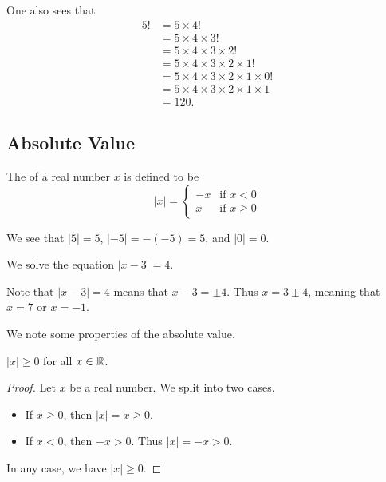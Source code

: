 \begin{example}
    One also sees that
    \begin{align*}
        5! &= 5 \times 4!\\
        &= 5 \times 4 \times 3!\\
        &= 5 \times 4 \times 3 \times 2!\\
        &= 5 \times 4 \times 3 \times 2 \times 1!\\
        &= 5 \times 4 \times 3 \times 2 \times 1 \times 0!\\
        &= 5 \times 4 \times 3 \times 2  \times 1  \times 1\\
        &= 120.
    \end{align*}
\end{example}

\subsection{Absolute Value}
\begin{definition}
    The  of a real number $x$ is defined to be
    \[
        |x| = \begin{cases}
            -x & \text{if } x < 0\\
            x & \text{if } x \geq 0
        \end{cases}
    \]
\end{definition}

\begin{example}
    We see that $|5| = 5$, $|-5| = -(-5) = 5$, and $|0| = 0$.
\end{example}

\begin{example}
    We solve the equation $|x-3| = 4$.

    Note that $|x-3| = 4$ means that $x-3 = \pm 4$. Thus $x = 3 \pm 4$, meaning that $x = 7$ or $x = -1$.
\end{example}

We note some properties of the absolute value.
\begin{proposition}
    $|x| \geq 0$ for all $x \in \mathbb{R}$.
\end{proposition}
\begin{proof}
    Let $x$ be a real number. We split into two cases.
    \begin{itemize}
        \item If $x \geq 0$, then $|x| = x \geq 0$.
        \item If $x < 0$, then $-x > 0$. Thus $|x| = -x > 0$.
    \end{itemize}
    In any case, we have $|x| \geq 0$.
\end{proof}

